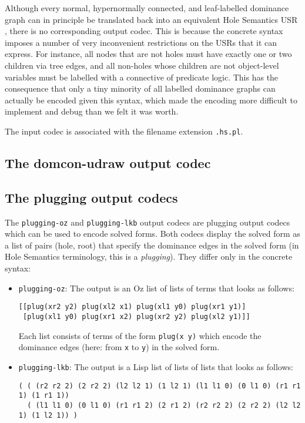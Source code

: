 Although every normal, hypernormally connected, and leaf-labelled
dominance graph can in principle be translated back into an equivalent
Hole Semantics USR \cite{KolNieTha03}, there is no corresponding
output codec. This is because the concrete syntax imposes a number of
very inconvenient restrictions on the USRs that it can express. For
instance, all nodes that are not holes must have exactly one or two
children via tree edges, and all non-holes whose children are not
object-level variables must be labelled with a connective of predicate
logic. This has the consequence that only a tiny minority of all
labelled dominance graphs can actually be encoded given this syntax,
which made the encoding more difficult to implement and debug than we
felt it was worth.

The input codec is associated with the filename extension \verb?.hs.pl?.




\subsection{The domcon-udraw output codec}






\subsection{The plugging output codecs}

The \verb?plugging-oz? and \verb?plugging-lkb? output codecs are
plugging output codecs which can be used to encode solved forms. Both
codecs display the solved form as a list of pairs (hole, root) that
specify the dominance edges in the solved form (in Hole Semantics
terminology, this is a \emph{plugging}). They differ only in the
concrete syntax:

\begin{itemize}
\item \verb?plugging-oz?: The output is an Oz list of lists of terms
  that looks as follows:
\begin{verbatim}
[[plug(xr2 y2) plug(xl2 x1) plug(xl1 y0) plug(xr1 y1)]
 [plug(xl1 y0) plug(xr1 x2) plug(xr2 y2) plug(xl2 y1)]]
\end{verbatim}
Each list consists of terms of the form \verb?plug(x y)? which encode
the dominance edges (here: from \verb?x? to \verb?y?) in the solved
form.
\item \verb?plugging-lkb?: The output is a Lisp list of lists of lists
  that looks as follows:
\begin{verbatim}
( ( (r2 r2 2) (2 r2 2) (l2 l2 1) (1 l2 1) (l1 l1 0) (0 l1 0) (r1 r1 1) (1 r1 1))
  ( (l1 l1 0) (0 l1 0) (r1 r1 2) (2 r1 2) (r2 r2 2) (2 r2 2) (l2 l2 1) (1 l2 1)) )
\end{verbatim}


\end{itemize}

